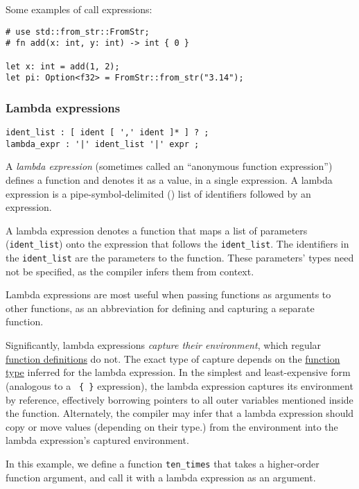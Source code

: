 \documentclass[]{article}
\begin{document}
Some examples of call expressions:

\begin{verbatim}
# use std::from_str::FromStr;
# fn add(x: int, y: int) -> int { 0 }

let x: int = add(1, 2);
let pi: Option<f32> = FromStr::from_str("3.14");
\end{verbatim}

\subsubsection{Lambda expressions}\label{lambda-expressions}

\begin{verbatim}
ident_list : [ ident [ ',' ident ]* ] ? ;
lambda_expr : '|' ident_list '|' expr ;
\end{verbatim}

A \emph{lambda expression} (sometimes called an ``anonymous function
expression'') defines a function and denotes it as a value, in a single
expression. A lambda expression is a pipe-symbol-delimited
(\texttt{\textbar{}}) list of identifiers followed by an expression.

A lambda expression denotes a function that maps a list of parameters
(\texttt{ident\_list}) onto the expression that follows the
\texttt{ident\_list}. The identifiers in the \texttt{ident\_list} are
the parameters to the function. These parameters' types need not be
specified, as the compiler infers them from context.

Lambda expressions are most useful when passing functions as arguments
to other functions, as an abbreviation for defining and capturing a
separate function.

Significantly, lambda expressions \emph{capture their environment},
which regular \hyperref[functions]{function definitions} do not. The
exact type of capture depends on the \hyperref[function-types]{function
type} inferred for the lambda expression. In the simplest and
least-expensive form (analogous to a \texttt{\textbar{}\textbar{} \{ \}}
expression), the lambda expression captures its environment by
reference, effectively borrowing pointers to all outer variables
mentioned inside the function. Alternately, the compiler may infer that
a lambda expression should copy or move values (depending on their
type.) from the environment into the lambda expression's captured
environment.

In this example, we define a function \texttt{ten\_times} that takes a
higher-order function argument, and call it with a lambda expression as
an argument.
\end{document}
